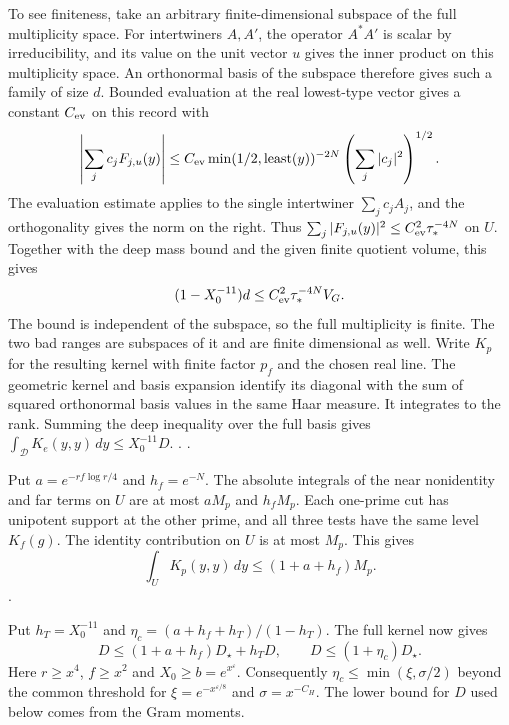 To see finiteness, take an arbitrary finite-dimensional subspace of
the full multiplicity space. For intertwiners \(A,A'\), the operator
\(A^*A'\) is scalar by irreducibility, and its value on the unit vector
\(u\) gives the inner product on this multiplicity space. An
orthonormal basis of the subspace therefore gives such a family of
size \(d\). Bounded evaluation at the real lowest-type
vector gives a constant \(C_{\rm ev}\) on this record with
\[
 \left|\sum_j c_j F_{j,u}(y)\right|
 \le C_{\rm ev}\min(1/2,\operatorname{least}(y))^{-2N}
         \left(\sum_j |c_j|^2\right)^{1/2}.
\]
The evaluation estimate applies to the single intertwiner
\(\sum_j c_j A_j\), and the orthogonality gives the norm on the
right. Thus \(\sum_j |F_{j,u}(y)|^2\le C_{\rm ev}^2\tau_*^{-4N}\)
on \(U\). Together with the deep mass bound and the given finite
quotient volume, this gives
\[
 (1-X_0^{-11})d\le C_{\rm ev}^2\tau_*^{-4N}V_G .
\]
The bound is independent of the subspace, so the full multiplicity
is finite. The two bad ranges are subspaces of it and are finite
dimensional as well. Write \(K_p\) for the resulting kernel with
finite factor \(p_f\) and the chosen real line. The geometric kernel
and basis expansion identify its diagonal with the sum of squared
orthonormal basis values in the same Haar measure. It integrates to
the rank. Summing the deep inequality over the full basis gives
\(\int_{\mathscr D} K_e(y,y)\,dy\le X_0^{-11}D\).
.
.

Put \(a=e^{-rf\log r/4}\) and \(h_f=e^{-N}\). The absolute integrals
of the near nonidentity and far terms on \(U\) are at most \(aM_p\) and
\(h_f M_p\). Each one-prime cut has unipotent support at the other
prime, and all three tests have the same level \(K_f(g)\). The identity
contribution on \(U\) is at most \(M_p\). This gives
\[ \int_U K_p(y,y)\,dy\le(1+a+h_f)M_p. \]
.

Put \(h_T=X_0^{-11}\) and
\(\eta_c=(a+h_f+h_T)/(1-h_T)\). The full kernel now gives
\[
 D\le(1+a+h_f)D_\star+h_TD,
 \qquad D\le(1+\eta_c)D_\star.
\]
Here \(r\ge x^4\), \(f\ge x^2\) and \(X_0\ge b=e^{x^\varepsilon}\).
Consequently \(\eta_c\le\min(\xi,\sigma/2)\) beyond the common
threshold for \(\xi=e^{-x^{\varepsilon/8}}\) and \(\sigma=x^{-C_H}\). The lower bound for \(D\) used below comes
from the Gram moments.

